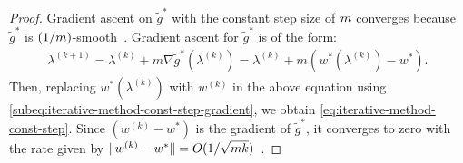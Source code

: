 \begin{proof}
{Gradient ascent on $\tilde{g}^*$ with the constant step size of $m$ converges because $\tilde{g}^*$ is $(1/m)$-smooth~\cite[Sec.~1.2.3]{nesterov2018lectures}.
Gradient ascent for $\tilde{g}^*$ is of the form:
\begin{align*}
    \lambda^{(k+1)} = \lambda^{(k)} + m\nabla \tilde{g}^*(\lambda^{(k)}) = \lambda^{(k)} + m(w^*(\lambda^{(k)}) - w^*).
\end{align*}
Then, replacing $w^*(\lambda^{(k)})$ with $w^{(k)}$ in the above equation using \eqref{subeq:iterative-method-const-step-gradient}, we obtain \eqref{eq:iterative-method-const-step}.
Since $(w^{(k)}-w^*)$ is the gradient of $\tilde{g}^*$, it converges to zero with %
the rate given by $\lVert w^{(k)} - w^*\rVert = O(1/\sqrt{m k})$~\cite[Eq.~1.2.22]{nesterov2018lectures}.}
\unskip
%
%
\end{proof}

